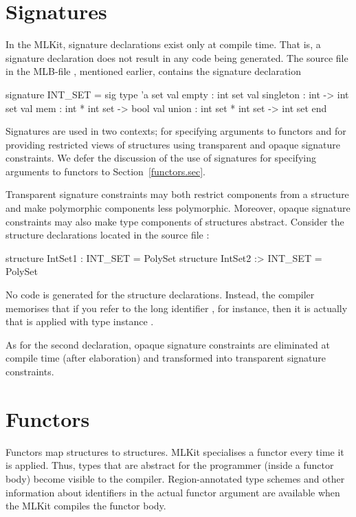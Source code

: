 \documentclass[12pt]{book}
\begin{document}
\section{Signatures}

%
%
In the MLKit, signature declarations exist only at compile time. That is, a
signature declaration does not result in any code being generated. The source
file  in the MLB-file , mentioned earlier,
contains the signature declaration
\begin{smlcode}
  signature INT_SET =
    sig
      type 'a set
      val empty : int set
      val singleton : int -> int set
      val mem : int * int set -> bool
      val union : int set * int set -> int set
    end
\end{smlcode}

Signatures are used in two contexts; for specifying arguments to functors and
for providing restricted views of structures using
%
%
%
transparent and
%
%
%
opaque signature constraints. We defer the discussion of the use of signatures
for specifying arguments to functors to Section~\ref{functors.sec}.

Transparent signature constraints may both restrict components from a structure
and make polymorphic components less polymorphic. Moreover, opaque signature
constraints may also make type components of structures abstract. Consider the
structure declarations located in the source file :
\begin{smlcode}
  structure IntSet1 : INT_SET = PolySet
  structure IntSet2 :> INT_SET = PolySet
\end{smlcode}

\noindent
No code is generated for the structure declarations. Instead, the compiler
memorises that if you refer to the long identifier , for
instance, then it is actually  that is applied with type
instance .

As for the second declaration, opaque signature constraints are eliminated at
compile time (after elaboration) and transformed into transparent signature
constraints.

\section{Functors \label{functors.sec}}

%
%
%
Functors map structures to structures. MLKit specialises a functor every
time it is applied.  Thus, types that are abstract for the programmer (inside a
functor body) become visible to the compiler.  Region-annotated type schemes and
other information about identifiers in the actual functor argument are available
when the MLKit compiles the functor body.
\end{document}
